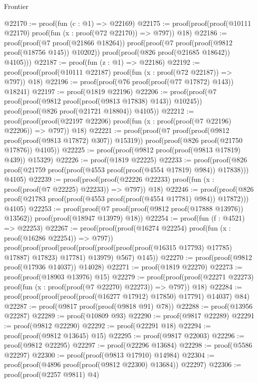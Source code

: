\begin{lexlean}{Frontier}
\begin{coremodule}
@22170 := proof(fun (c : @1) => @22169)
@22175 := proof(proof(proof(@10111 @22170) proof(fun (x : proof(@72 @22170)) => @797)) @18)
@22186 := proof(proof(@7 proof(@21866 @18264))
      proof(proof(@7 proof(proof(@9812 proof(@18756 @145)) @10202))
          proof(proof(@826 proof(@21685 @18642)) @4105)))
@22187 := proof(fun (z : @1) => @22186)
@22192 := proof(proof(proof(@10111 @22187) proof(fun (x : proof(@72 @22187)) => @797)) @18)
@22196 := proof(proof(@76 proof(proof(@77 @17872) @143)) @18241)
@22197 := proof(@1819 @22196)
@22206 := proof(proof(@7 proof(proof(@9812 proof(proof(@9813 @17838) @143)) @10245))
      proof(proof(@826 proof(@21721 @18804)) @4105))
@22212 := proof(proof(proof(@22197 @22206) proof(fun (x : proof(proof(@7 @22196) @22206)) => @797))
      @18)
@22221 := proof(proof(@7 proof(proof(@9812 proof(proof(@9813 @17872) @307)) @15319))
      proof(proof(@826 proof(@21750 @17876)) @4105))
@22225 := proof(proof(@9812 proof(proof(@9813 @17819) @439)) @15329)
@22226 := proof(@1819 @22225)
@22233 := proof(proof(@826 proof(@21759 proof(proof(@4553 proof(proof(@4554 @17819) @984)) @17838)))
      @4105)
@22239 := proof(proof(proof(@22226 @22233) proof(fun (x : proof(proof(@7 @22225) @22233)) => @797))
      @18)
@22246 := proof(proof(@826 proof(@21783 proof(proof(@4553 proof(proof(@4554 @17781) @984)) @17872)))
      @4105)
@22253 := proof(proof(@7 proof(proof(@9812 proof(@17888 @13976)) @13562))
      proof(proof(@18947 @13979) @18))
@22254 := proof(fun (f : @4521) => @22253)
@22267 := proof(proof(proof(@16274 @22254) proof(fun (x : proof(@16286 @22254)) => @797))
      proof(proof(proof(proof(proof(proof(proof(proof(@16315 @17793) @17785) @17887) @17823) @17781)
              @13979)
            @567)
          @145))
@22270 := proof(proof(@9812 proof(@17936 @14037)) @14028)
@22271 := proof(@1819 @22270)
@22273 := proof(proof(@18903 @13976) @15)
@22279 := proof(proof(proof(@22271 @22273) proof(fun (x : proof(proof(@7 @22270) @22273)) => @797))
      @18)
@22284 := proof(proof(proof(proof(proof(@16277 @17912) @17850) @17791) @14037) @84)
@22287 := proof(@9817 proof(proof(@9818 @91) @78))
@22288 := proof(@13956 @22287)
@22289 := proof(@10809 @93)
@22290 := proof(@9817 @22289)
@22291 := proof(@9812 @22290)
@22292 := proof(@22291 @18)
@22294 := proof(proof(@9812 @13645) @15)
@22295 := proof(@9817 @22003)
@22296 := proof(@9812 @22295)
@22297 := proof(@22296 @13684)
@22298 := proof(@5586 @22297)
@22300 := proof(proof(@9813 @17910) @14984)
@22304 := proof(proof(@4896 proof(proof(@9812 @22300) @13684)) @22297)
@22306 := proof(proof(@2257 @9811) @4)

\end{coremodule}
\end{lexlean}

